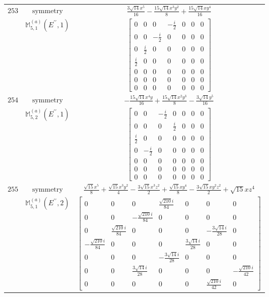 \documentclass[fleqn,8pt,landscape]{jsarticle}
\begin{document}
\begin{longtable}{ccc}
$ 253 $ & $ \text{symmetry} $ & $ \frac{3 \sqrt{14} x^{5}}{16} - \frac{15 \sqrt{14} x^{3} y^{2}}{8} + \frac{15 \sqrt{14} x y^{4}}{16} $ \\
$  $ & $ \mathbb{M}_{5,1}^{(a)}(E^{\prime\prime},1) $ & $ \begin{bmatrix} 0 & 0 & 0 & - \frac{i}{2} & 0 & 0 & 0 \\ 0 & 0 & - \frac{i}{2} & 0 & 0 & 0 & 0 \\ 0 & \frac{i}{2} & 0 & 0 & 0 & 0 & 0 \\ \frac{i}{2} & 0 & 0 & 0 & 0 & 0 & 0 \\ 0 & 0 & 0 & 0 & 0 & 0 & 0 \\ 0 & 0 & 0 & 0 & 0 & 0 & 0 \\ 0 & 0 & 0 & 0 & 0 & 0 & 0 \end{bmatrix} $ \\ \hline
$ 254 $ & $ \text{symmetry} $ & $ - \frac{15 \sqrt{14} x^{4} y}{16} + \frac{15 \sqrt{14} x^{2} y^{3}}{8} - \frac{3 \sqrt{14} y^{5}}{16} $ \\
$  $ & $ \mathbb{M}_{5,2}^{(a)}(E^{\prime\prime},1) $ & $ \begin{bmatrix} 0 & 0 & - \frac{i}{2} & 0 & 0 & 0 & 0 \\ 0 & 0 & 0 & \frac{i}{2} & 0 & 0 & 0 \\ \frac{i}{2} & 0 & 0 & 0 & 0 & 0 & 0 \\ 0 & - \frac{i}{2} & 0 & 0 & 0 & 0 & 0 \\ 0 & 0 & 0 & 0 & 0 & 0 & 0 \\ 0 & 0 & 0 & 0 & 0 & 0 & 0 \\ 0 & 0 & 0 & 0 & 0 & 0 & 0 \end{bmatrix} $ \\ \hline
$ 255 $ & $ \text{symmetry} $ & $ \frac{\sqrt{15} x^{5}}{8} + \frac{\sqrt{15} x^{3} y^{2}}{4} - \frac{3 \sqrt{15} x^{3} z^{2}}{2} + \frac{\sqrt{15} x y^{4}}{8} - \frac{3 \sqrt{15} x y^{2} z^{2}}{2} + \sqrt{15} x z^{4} $ \\
$  $ & $ \mathbb{M}_{5,1}^{(a)}(E^{\prime\prime},2) $ & $ \begin{bmatrix} 0 & 0 & 0 & \frac{\sqrt{210} i}{84} & 0 & 0 & 0 \\ 0 & 0 & - \frac{\sqrt{210} i}{84} & 0 & 0 & 0 & 0 \\ 0 & \frac{\sqrt{210} i}{84} & 0 & 0 & 0 & - \frac{3 \sqrt{14} i}{28} & 0 \\ - \frac{\sqrt{210} i}{84} & 0 & 0 & 0 & \frac{3 \sqrt{14} i}{28} & 0 & 0 \\ 0 & 0 & 0 & - \frac{3 \sqrt{14} i}{28} & 0 & 0 & 0 \\ 0 & 0 & \frac{3 \sqrt{14} i}{28} & 0 & 0 & 0 & - \frac{\sqrt{210} i}{42} \\ 0 & 0 & 0 & 0 & 0 & \frac{\sqrt{210} i}{42} & 0 \end{bmatrix} $ \\ \hline

\end{longtable}
\end{document}
